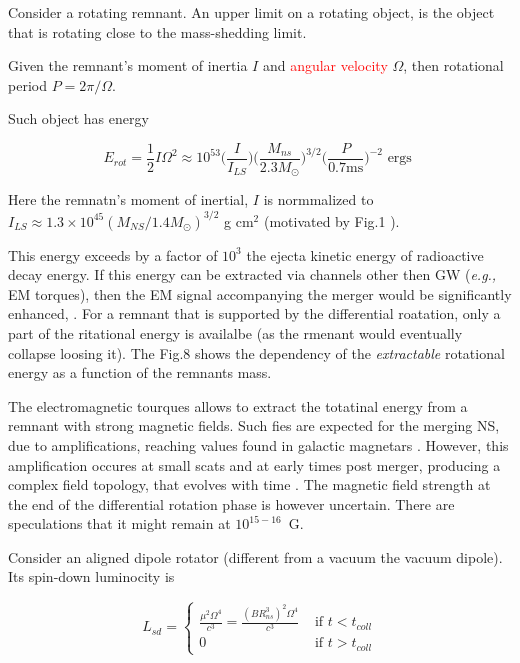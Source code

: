 \documentclass[11pt,a4paper,headinclude=true,DIV=14,BCOR=8mm,chapterprefix,listof=totoc,twoside,openright,abstracton]{scrbook}
\newcommand{\red}[1]{\textcolor{red}{#1}}
\begin{document}
Consider a rotating remnant. An upper limit on a rotating object, is the object that is rotating close to the mass-shedding limit. 

Given the remnant's moment of inertia $I$ and \red{angular velocity} $\Omega$, then rotational period $P = 2\pi / \Omega$. 

Such object has energy 

\begin{equation}
    E_{rot} = \frac{1}{2}I\Omega^2 \approx 10^{53} \Big(\frac{I}{I_{LS}}\Big)\Big(\frac{M_{ns}}{2.3M_{\odot}}\Big)^{3/2}\Big(\frac{P}{0.7\text{ms}}\Big)^{-2} \text{ ergs }
\end{equation}

Here the remnatn's moment of inertial, $I$ is normmalized to $I_{LS} \approx 1.3\times 10^{45}(M_{NS}/1.4M_{\odot})^{3/2}$ g cm$^{2}$ (motivated by Fig.1 \cite{Lattimer and Schutz (2005}).

This energy exceeds by a factor of $10^3$ the ejecta kinetic energy of radioactive decay energy.
If this energy can be extracted via channels other then GW (\textit{e.g.,} EM torques), then the EM signal accompanying the merger would be significantly enhanced, \cite{(Gao et al 2013; Metzger and Piro 2014; Gao et al 2015; Siegel and Ciolfi 2016a)}. For a remnant that is supported by the differential roatation, only a part of the ritational energy is availalbe (as the rmenant would eventually collapse loosing it). The Fig.8 shows the dependency of the \textit{extractable} rotational energy as a function of the remnants mass.

The electromagnetic tourques allows to extract the totatinal energy from a remnant with strong magnetic fields. Such fies are expected for the merging NS, due to amplifications, reaching values found in galactic magnetars \cite{(Price and Rosswog 2006; Zrake and Mac-Fadyen 2013; Kiuchi et al 2014)}. However, this amplification occures at small scats and at early times post merger, producing a complex field topology, that evolves with time \cite{(Siegel et al 2014)}. The magnetic field strength at the end of the differential rotation phase is however uncertain. There are speculations that it might remain at $10^{15-16}$~G.

Consider an aligned dipole rotator (different from a vacuum the vacuum dipole). Its spin-down luminocity is \cite{Spitkovsky (2006); Philippov et al (2015)} 

\begin{equation}
    L_{sd} = 
    \begin{cases}
        \frac{\mu^2 \Omega^4}{c^3} = \frac{(B R_{ns}^3)^2 \Omega^4}{c^3} &\text{ if } t< t_{coll} \\
        0 &\text{ if } t> t_{coll}
    \end{cases}
\end{equation}
\end{document}
